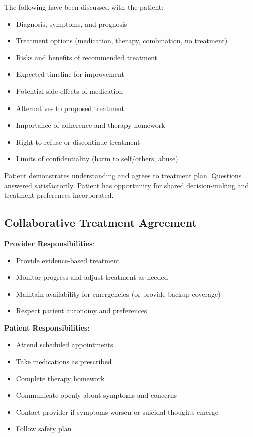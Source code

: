 \documentclass[11pt,letterpaper]{article}
\begin{document}
The following have been discussed with the patient:
\begin{itemize}[leftmargin=*]
    \item Diagnosis, symptoms, and prognosis
    \item Treatment options (medication, therapy, combination, no treatment)
    \item Risks and benefits of recommended treatment
    \item Expected timeline for improvement
    \item Potential side effects of medication
    \item Alternatives to proposed treatment
    \item Importance of adherence and therapy homework
    \item Right to refuse or discontinue treatment
    \item Limits of confidentiality (harm to self/others, abuse)
\end{itemize}

Patient demonstrates understanding and agrees to treatment plan. Questions answered satisfactorily. Patient has opportunity for shared decision-making and treatment preferences incorporated.

\subsection*{Collaborative Treatment Agreement}

\textbf{Provider Responsibilities}:
\begin{itemize}[leftmargin=*]
    \item Provide evidence-based treatment
    \item Monitor progress and adjust treatment as needed
    \item Maintain availability for emergencies (or provide backup coverage)
    \item Respect patient autonomy and preferences
\end{itemize}

\textbf{Patient Responsibilities}:
\begin{itemize}[leftmargin=*]
    \item Attend scheduled appointments
    \item Take medications as prescribed
    \item Complete therapy homework
    \item Communicate openly about symptoms and concerns
    \item Contact provider if symptoms worsen or suicidal thoughts emerge
    \item Follow safety plan
\end{itemize}
\end{document}
